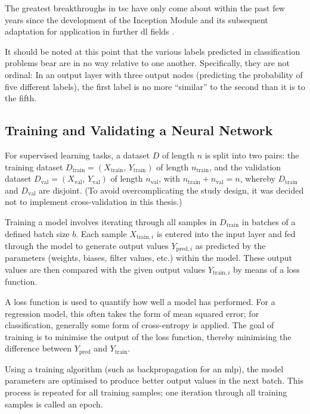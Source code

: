 The greatest breakthroughs in \ac{tsc} have only come about within the past few years since the development of the Inception Module and its subsequent adaptation for application in further \ac{dl} fields \cite{ismail_fawaz_deep_2019, fawaz_inceptiontime_2019}.

It should be noted at this point that the various labels predicted in classification problems bear are in no way relative to one another. Specifically, they are not ordinal: In an output layer with three output nodes (predicting the probability of five different labels), the first label is no more ``similar'' to the second than it is to the fifth.

\subsection{Training and Validating a Neural Network}
For supervised learning tasks, a dataset \(D\) of length \(n\) is split into two pairs: the training dataset \(D_{\text{train}} = \left(X_{\text{train}},\,Y_{\text{train}}\right)\) of length \(n_{\text{train}}\), and the validation dataset \(D_{\text{val}} = \left(X_{\text{val}},\,Y_{\text{val}}\right)\) of length \(n_{\text{val}}\), with \(n_{\text{train}} + n_{\text{val}} = n\), whereby \(D_{\text{train}}\) and \(D_{\text{val}}\) are disjoint. (To avoid overcomplicating the study design, it was decided not to implement cross-validation in this thesis.)

Training a model involves iterating through all samples in \(D_{\text{train}}\) in batches of a defined batch size \(b\). Each sample \(X_{\text{train}, i}\) is entered into the input layer and fed through the model to generate output values \(Y_{\text{pred}, i}\) as predicted by the parameters (weights, biases, filter values, etc.) within the model. These output values are then compared with the given output values \(Y_{\text{train}, i}\) by means of a loss function.

A loss function is used to quantify how well a model has performed. For a regression model, this often takes the form of mean squared error; for classification, generally some form of cross-entropy is applied. The goal of training is to minimise the output of the loss function, thereby minimising the difference between \(Y_{\text{pred}}\) and \(Y_{\text{train}}\).

Using a training algorithm (such as backpropagation for an \ac{mlp}), the model parameters are optimised to produce better output values in the next batch. This process is repeated for all training samples; one iteration through all training samples is called an epoch. \cite[]{kirk_thoughtful_2017}

